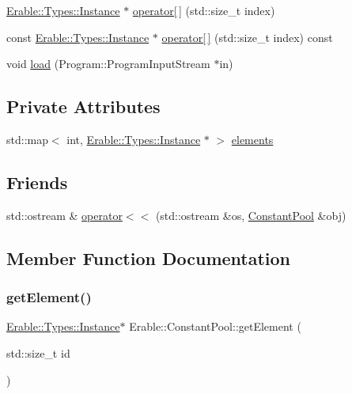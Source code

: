 \begin{DoxyCompactItemize}
\item 
\mbox{\hyperlink{class_erable_1_1_erable_1_1_types_1_1_instance}{Erable\+::\+Types\+::\+Instance}} $\ast$ \mbox{\hyperlink{class_erable_1_1_constant_pool_a27b506e641c44a1775370d9c857f965d}{operator\mbox{[}$\,$\mbox{]}}} (std\+::size\+\_\+t index)
\item 
const \mbox{\hyperlink{class_erable_1_1_erable_1_1_types_1_1_instance}{Erable\+::\+Types\+::\+Instance}} $\ast$ \mbox{\hyperlink{class_erable_1_1_constant_pool_af260e8d99d978ceeed2bfb15533e2e87}{operator\mbox{[}$\,$\mbox{]}}} (std\+::size\+\_\+t index) const
\item 
void \mbox{\hyperlink{class_erable_1_1_constant_pool_a2687b1a6e7114bd65df2759ee9998a6f}{load}} (Program\+::\+Program\+Input\+Stream $\ast$in)
\end{DoxyCompactItemize}
\subsection*{Private Attributes}
\begin{DoxyCompactItemize}
\item 
std\+::map$<$ int, \mbox{\hyperlink{class_erable_1_1_erable_1_1_types_1_1_instance}{Erable\+::\+Types\+::\+Instance}} $\ast$ $>$ \mbox{\hyperlink{class_erable_1_1_constant_pool_a5f02e366a42ade736b908744e1052b09}{elements}}
\end{DoxyCompactItemize}
\subsection*{Friends}
\begin{DoxyCompactItemize}
\item 
std\+::ostream \& \mbox{\hyperlink{class_erable_1_1_constant_pool_ab4af687e7e403b71e9f9e1a4d42909d7}{operator$<$$<$}} (std\+::ostream \&os, \mbox{\hyperlink{class_erable_1_1_constant_pool}{Constant\+Pool}} \&obj)
\end{DoxyCompactItemize}


\subsection{Member Function Documentation}
\mbox{\label{class_erable_1_1_constant_pool_a730533e6a8846e302b3f4f4a0073c7bd}} 
\subsubsection{\texorpdfstring{getElement()}{getElement()}}
{\footnotesize\ttfamily \mbox{\hyperlink{class_erable_1_1_erable_1_1_types_1_1_instance}{Erable\+::\+Types\+::\+Instance}}$\ast$ Erable\+::\+Constant\+Pool\+::get\+Element (\begin{DoxyParamCaption}\item[{std\+::size\+\_\+t}]{id }\end{DoxyParamCaption})\hspace{0.3cm}{\ttfamily [inline]}}

